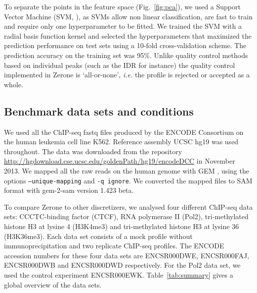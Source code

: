 \documentclass{bioinfo}
\begin{document}
\begin{methods}
To separate the points in the feature space (Fig.~\ref{fig:pca}),
we used a Support Vector Machine (SVM, \citealp{Chang2011,e1071}),
as SVMs allow non linear classification, are fast to train and
require only one hyperparameter to be fitted.
We trained the SVM with a radial basis function kernel and
selected the hyperparameters that maximized the prediction
performance on test sets using a 10-fold cross-validation scheme.
The prediction accuracy on the training set was 95\%. Unlike
quality control methods based on individual peaks (such as the
IDR for instance) the quality control implemented in Zerone is
`all-or-none', \textit{i.e.} the profile is rejected or accepted
as a whole.

\subsection{Benchmark data sets and conditions}
\label{sub:bench_cond}
We used all the ChIP-seq fastq files produced by the ENCODE Consortium
on the human leukemia cell line K562. Reference assembly UCSC hg19 was
used throughout. The data was downloaded from the repository
\href{http://hgdownload.cse.ucsc.edu/goldenPath/hg19/encodeDCC}{http://hgdownload.cse.ucsc.edu/goldenPath/hg19/encodeDCC} in November 2013.
We mapped all the raw reads on the human genome with
GEM \citep[gem-mapper version 1.376 beta, gem-indexer version
1.423 beta,][]{pmid23103880}, using the options \texttt{--unique-mapping} and
\texttt{-q ignore}. We converted the mapped files to SAM format with
gem-2-sam version 1.423 beta.

To compare Zerone to other discretizers, we analysed four different
ChIP-seq data sets: CCCTC-binding factor (CTCF), RNA polymerase II
(Pol2), tri-methylated histone H3 at lysine 4 (H3K4me3)
and tri-methylated histone H3 at lysine 36 (H3K36me3).
Each data set consists of a mock profile without immunoprecipitation
and two replicate ChIP-seq profiles.
The ENCODE accession numbers for these four data sets are
ENCSR000DWE, ENCSR000FAJ, ENCSR000DWB and ENCSR000DWD respectively.
For the Pol2 data set, we used the control experiment ENCSR000EWK.
Table~\ref{tab:summary} gives a global overview of the data sets.


\end{methods}
\end{document}
